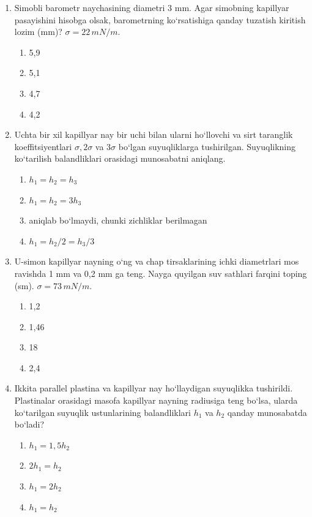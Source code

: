 \begin{enumerate}
\item Simobli barometr naychasining diametri 3 mm. Agar simobning kapillyar pasayishini hisobga olsak, barometrning ko‘rsatishiga qanday tuzatish kiritish lozim (mm)? $\sigma = 22 \, mN/m$.
\begin{enumerate}[label=\Alph*)]
\item 5,9
\item 5,1
\item 4,7
\item 4,2
\end{enumerate}

\item Uchta bir xil kapillyar nay bir uchi bilan ularni ho‘llovchi va sirt taranglik koeffitsiyentlari $\sigma, 2\sigma$ va $3\sigma$ bo‘lgan suyuqliklarga tushirilgan. Suyuqlikning ko‘tarilish balandliklari orasidagi munosabatni aniqlang.
\begin{enumerate}[label=\Alph*)]
\item $h_1 = h_2 = h_3$
\item $h_1 = h_2 = 3h_3$
\item aniqlab bo‘lmaydi, chunki zichliklar berilmagan
\item $h_1 = h_2/2 = h_3/3$
\end{enumerate}

\item U-simon kapillyar nayning o‘ng va chap tirsaklarining ichki diametrlari mos ravishda 1 mm va 0,2 mm ga teng. Nayga quyilgan suv sathlari farqini toping (sm). $\sigma = 73 \, mN/m$.
\begin{enumerate}[label=\Alph*)]
\item 1,2
\item 1,46
\item 18
\item 2,4
\end{enumerate}

\item Ikkita parallel plastina va kapillyar nay ho‘llaydigan suyuqlikka tushirildi. Plastinalar orasidagi masofa kapillyar nayning radiusiga teng bo‘lsa, ularda ko‘tarilgan suyuqlik ustunlarining balandliklari $h_1$ va $h_2$ qanday munosabatda bo‘ladi?
\begin{enumerate}[label=\Alph*)]
\item $h_1 = 1,5h_2$
\item $2h_1 = h_2$
\item $h_1 = 2h_2$
\item $h_1 = h_2$
\end{enumerate}


\end{enumerate}
